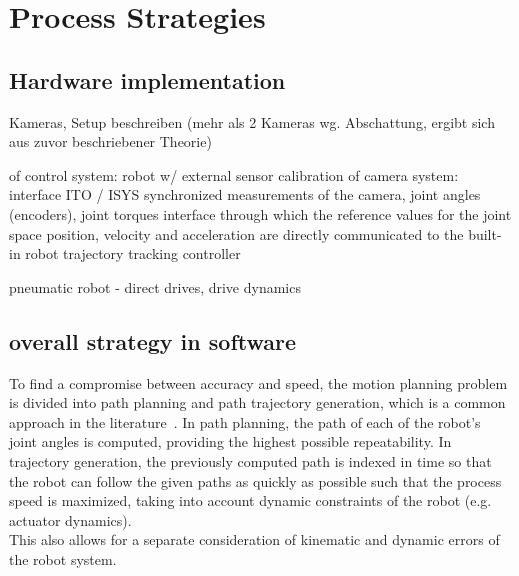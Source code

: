 \documentclass[5p,times,procedia]{elsarticle}
\begin{document}
\section{Process Strategies}
\subsection{Hardware implementation} 

Kameras, Setup beschreiben (mehr als 2 Kameras wg. Abschattung, ergibt sich aus zuvor beschriebener Theorie)


of control system: robot w/ external sensor
calibration of camera system: interface ITO / ISYS
synchronized measurements of the camera, joint angles (encoders), joint torques 
interface through which the reference values for the joint space position, velocity and acceleration are directly communicated to the built-in robot trajectory tracking controller

pneumatic robot - direct drives, drive dynamics 

\subsection{overall strategy in software}
To find a compromise between accuracy and speed, the motion planning problem is divided into path planning and path trajectory generation, which is a common approach in the literature~\cite{Choset05}.
In path planning, the path of each of the robot’s joint angles is computed, providing the highest possible repeatability.
In trajectory generation, the previously computed path is indexed in time so that the robot can follow the given paths as quickly as possible such that the process speed is maximized, taking into account dynamic constraints of the robot (e.g. actuator dynamics).
\\
This also allows for a separate consideration of kinematic and dynamic errors of the robot system. 
\end{document}
